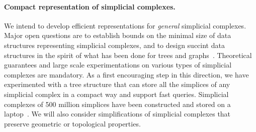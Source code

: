 \paragraph{Compact representation of simplicial complexes.}  We intend to develop efficient representations for {\em general} simplicial complexes. 
Major open questions are to establish bounds on the minimal size of data structures representing simplicial complexes, and to design succint data structures
in the spirit of what has been done for trees and graphs~\cite{Ferragina:2005:SLT:1097112.1097456,Munro:2002:SRB:586840.586885}. 
 Theoretical guarantees and large scale experimentations on various types of simplicial complexes are mandatory. As a first encouraging step in this direction, we have experimented with a tree structure that can store all the simplices of any simplicial complex in a compact way and support fast queries. Simplicial complexes of 500 million simplices have been constructed and stored on a laptop~\cite{bm-dssc-2012}. 
We will also consider simplifications of simplicial complexes that preserve geometric or topological properties.










